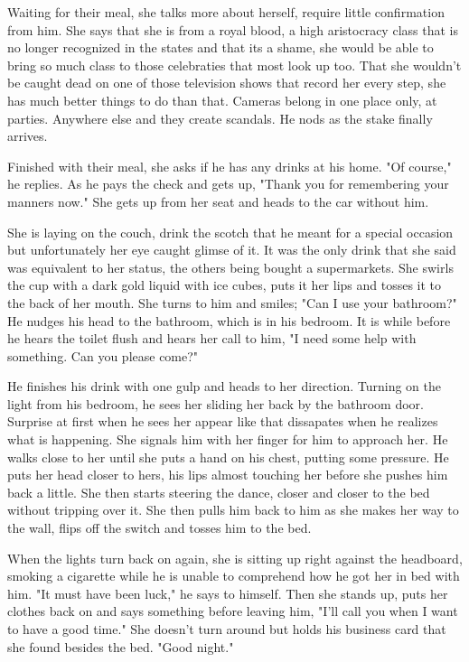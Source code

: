         Waiting for their meal, she talks more about herself, require little confirmation from him. She says that she is from a royal blood,
    a high aristocracy class that is no longer recognized in the states and that its a shame, she would be able to bring so much class to
    those celebraties that most look up too. That she wouldn't be caught dead on one of those television shows that record her every step, she
    has much better things to do than that. Cameras belong in one place only, at parties. Anywhere else and they create scandals. He nods as the
    stake finally arrives.

        Finished with their meal, she asks if he has any drinks at his home. "Of course," he replies. As he pays the check and gets up, "Thank
    you for remembering your manners now." She gets up from her seat and heads to the car without him.

        She is laying on the couch, drink the scotch that he meant for a special occasion but unfortunately her eye caught glimse of it. It 
    was the only drink that she said was equivalent to her status, the others being bought a supermarkets. She swirls the cup with a dark gold
    liquid with ice cubes, puts it her lips and tosses it to the back of her mouth. She turns to him and smiles; "Can I use your bathroom?" He
    nudges his head to the bathroom, which is in his bedroom. It is while before he hears the toilet flush and hears her call to him, "I need 
    some help with something. Can you please come?"

        He finishes his drink with one gulp and heads to her direction. Turning on the light from his bedroom, he sees her sliding her back by
    the bathroom door. Surprise at first when he sees her appear like that dissapates when he realizes what is happening. She signals him with
    her finger for him to approach her. He walks close to her until she puts a hand on his chest, putting some pressure. He puts her head closer
    to hers, his lips almost touching her before she pushes him back a little. She then starts steering the dance, closer and closer to the bed
    without tripping over it. She then pulls him back to him as she makes her way to the wall, flips off the switch and tosses him to the bed.

        When the lights turn back on again, she is sitting up right against the headboard, smoking a cigarette while he is unable to comprehend
    how he got her in bed with him. "It must have been luck," he says to himself. Then she stands up, puts her clothes back on and says something
    before leaving him, "I'll call you when I want to have a good time." She doesn't turn around but holds his business card that she found 
    besides the bed. "Good night."

